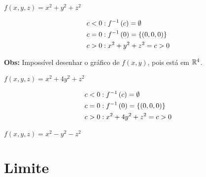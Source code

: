 \documentclass{book}
\begin{document}
\newpage

\begin{ex}
$f\left( {x,y,z} \right) = x^2  + y^2  + z^2$
\end{ex}

\begin{sol}
\[
\begin{gathered}
c < 0:f^{ - 1} \left( c \right) = \emptyset  \hfill \\
  c = 0:f^{ - 1} \left( 0 \right) = \left\{ {\left( {0,0,0} \right)} \right\} \hfill \\
c > 0:x^2  + y^2  + z^2  = c > 0 \hfill \\
\end{gathered}
\]



\textbf{Obs:} Imposs\'ivel desenhar o gr\'afico de $f(x,y)$, pois est\'a em $\mathbb{R}^4$.
\end{sol}

\begin{ex}
$f\left( {x,y,z} \right) = x^2  + 4y^2  + z^2$
\end{ex}

\begin{sol}
\[
\begin{gathered}
c < 0:f^{ - 1} \left( c \right) = \emptyset  \hfill \\
  c = 0:f^{ - 1} \left( 0 \right) = \left\{ {\left( {0,0,0} \right)} \right\} \hfill \\
c > 0:x^2  + 4y^2  + z^2  = c > 0 \hfill \\
\end{gathered}
\]


\end{sol}

\begin{ex}
$f\left( {x,y,z} \right) = x^2  - y^2  - z^2$
\end{ex}

\section{Limite} \label{sec10}
\end{document}
